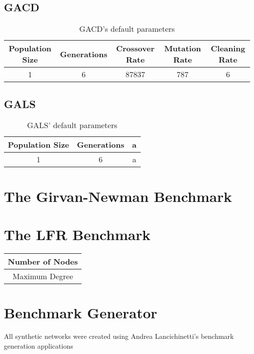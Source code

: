 \subsection{GACD}
\cite{Shi2009}
\begin{table}[h!]
	\centering
	\begin{tabular}{| c | c | c | c | c |}
		\hline
		Population Size & Generations & Crossover Rate & Mutation Rate  & Cleaning Rate \\ [0.5ex] 
		\hline
		1 & 6 & 87837 & 787 & 6  \\ 
		
		\hline
	\end{tabular}
	\caption{GACD's default parameters}
	\label{table:1}
\end{table}


\subsection{GALS}
\cite{liu2013genetic}
\begin{table}[h!]
	\centering
	\begin{tabular}{| c | c | c |}
		\hline
		Population Size & Generations  & a \\ [0.5ex] 
		\hline
		1 & 6 & a \\ 
		
		\hline
	\end{tabular}
	\caption{GALS' default parameters}
	\label{table:1}
\end{table}


\section{The Girvan-Newman Benchmark}



\section{The LFR Benchmark}
\begin{tabular}{|c|}
	\hline 
	Number of Nodes \\ 
	\hline 
	Maximum Degree \\ 
	\hline 
\end{tabular} 

\cite{Lancichinetti2008}


\section{Benchmark Generator}
All synthetic networks were created using Andrea Lancichinetti's benchmark generation applications 

